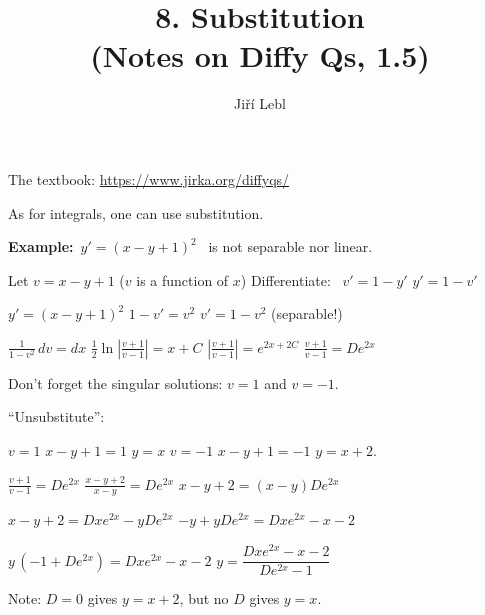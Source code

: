 \documentclass[10pt,aspectratio=169]{beamer}
\author{Ji\v{r}\'i Lebl}
\institute[OSU]{%
Oklahoma State University%
}
\title{8. Substitution\\(Notes on Diffy Qs, 1.5)}
\date{}
\begin{document}
\begin{frame}
\titlepage


\begin{center}
The textbook: \url{https://www.jirka.org/diffyqs/}
\end{center}
\end{frame}

\begin{frame}
As for integrals, one can use substitution.

\medskip
\pause

\textbf{Example:}~$y' = {(x-y+1)}^2$~ is not separable nor linear.

\medskip
\pause

Let $v = x-y+1$
\pause
\quad
($v$ is a function of $x$)
\qquad
\pause
Differentiate: ~$v' = 1 - y'$
\pause
\wthus
$y' = 1-v'$

\medskip
\pause

$y' = {(x-y+1)}^2$
\wthus
$1-v' = v^2$
\pause
\wthus
$v' = 1-v^2$
\quad
\pause
(separable!)

\medskip
\pause

$\displaystyle
\frac{1}{1-v^2} \,dv = dx$
\pause
\wthus
$\displaystyle
\frac{1}{2} \ln \left\lvert  \frac{v+1}{v-1} \right\rvert = x + C$
\pause
\wthus
$\displaystyle
\left\lvert \frac{v+1}{v-1} \right\rvert = e^{2x + 2C}$
\pause
\wthus
$\displaystyle
\frac{v+1}{v-1} = D e^{2x}$

\medskip
\pause

Don't forget the singular solutions: $v=1$ and $v=-1$.

\medskip
\pause

``Unsubstitute'':

\medskip
\pause

$v=1$
\pause
\wthus
$x-y+1=1$
\pause
\wthus $y=x$
\pause
\hfill
$v=-1$
\pause
\wthus
$x-y+1=-1$
\pause
\wthus
$y=x+2$.

\medskip
\pause

$\displaystyle
\frac{v+1}{v-1} = D e^{2x}$
\pause
\wthus
$\displaystyle
\frac{x-y+2}{x-y} = D e^{2x}$
\pause
\wthus
$x-y+2 = (x-y)D e^{2x}$

\medskip

\pause
\wthus
$x-y+2 = Dx e^{2x}-yD e^{2x}$
\pause
\wthus
$-y + yD e^{2x} = Dx e^{2x} - x - 2$

\medskip

\pause
\wthus
$y\,(-1+ D e^{2x}) = Dx e^{2x} - x - 2$
\pause
\wthus
$y  = \dfrac{Dx e^{2x} - x - 2}{D e^{2x}-1}$

\medskip
\pause

Note: $D=0$ gives $y=x+2$, but no $D$ gives $y=x$.

\end{frame}
\end{document}
